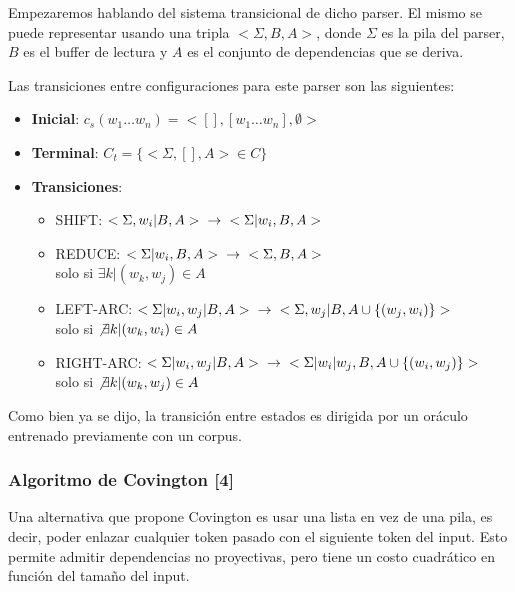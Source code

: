 \documentclass[11pt,a4paper,spanish]{article}
\begin{document}
Empezaremos hablando del sistema transicional de dicho parser. El mismo se puede representar usando 
una tripla $<\Sigma, B, A>$, donde $\Sigma$ es la pila del parser, $B$ es el buffer de lectura y $A$ 
es el conjunto de dependencias que se deriva. 

Las transiciones entre configuraciones para este parser son las siguientes:
\begin{itemize}
\item \textbf{Inicial}: $c_s(w_1\dots w_n) = <[], [w_1\dots w_n],\emptyset>$
\item \textbf{Terminal}: $C_t = \{<\Sigma,[],A>\in C\}$
\item \textbf{Transiciones}:   
    \begin{itemize}
    \item SHIFT:      $<\Sigma,w_i|B,A> \hspace{0.2cm} \rightarrow \hspace{0.2cm} <\Sigma|w_i,B,A>$
    \item REDUCE:     $<\Sigma|w_i,B,A> \hspace{0.2cm} \rightarrow \hspace{0.2cm} <\Sigma,B,A >$ \\
solo si $\exists k | (w_k,w_j)\in A$ 
    \item LEFT-ARC:   $<\Sigma|w_i,w_j|B,A> \hspace{0.2cm} \rightarrow \hspace{0.2cm} <\Sigma,w_j|B,A\cup \{(w_j,w_i)\}>$ \\
solo si $\not\exists k | (w_k,w_i)\in A$
    \item RIGHT-ARC: $<\Sigma|w_i,w_j|B,A> \hspace{0.2cm}\rightarrow \hspace{0.2cm} 
<\Sigma|w_i|w_j,B,A\cup \{(w_i,w_j)\}>$ \\ 
solo si $\not\exists k | (w_k,w_j)\in A$
    \end{itemize}
\end{itemize}

Como bien ya se dijo, la transición entre estados es dirigida por un oráculo entrenado previamente 
con un corpus.

\subsubsection{Algoritmo de Covington [4]}

Una alternativa que propone Covington es usar una lista en vez de una pila, es decir, poder enlazar cualquier token pasado con el siguiente token del input. Esto permite admitir dependencias no proyectivas, pero tiene un costo cuadrático en función del tamaño del input.
\end{document}
